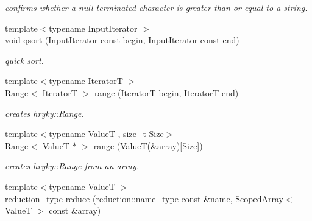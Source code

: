 \begin{DoxyCompactItemize}
\begin{DoxyCompactList}\small\item\em confirms whether a null-\/terminated character is greater than or equal to a string. \end{DoxyCompactList}\item 
{\footnotesize template$<$typename Input\-Iterator $>$ }\\void \hyperlink{namespacehryky_a438e3ee8f5109856c4a1e4daa9980982}{qsort} (Input\-Iterator const begin, Input\-Iterator const end)
\begin{DoxyCompactList}\small\item\em quick sort. \end{DoxyCompactList}\item 
\hypertarget{namespacehryky_a6093192359bc9630d58d6158bd0178f4}{{\footnotesize template$<$typename Iterator\-T $>$ }\\\hyperlink{classhryky_1_1_range}{Range}$<$ Iterator\-T $>$ \hyperlink{namespacehryky_a6093192359bc9630d58d6158bd0178f4}{range} (Iterator\-T begin, Iterator\-T end)}\label{namespacehryky_a6093192359bc9630d58d6158bd0178f4}

\begin{DoxyCompactList}\small\item\em creates \hyperlink{classhryky_1_1_range}{hryky\-::\-Range}. \end{DoxyCompactList}\item 
\hypertarget{namespacehryky_a6a1faca6d065095210f29e66a3219e1d}{{\footnotesize template$<$typename Value\-T , size\-\_\-t Size$>$ }\\\hyperlink{classhryky_1_1_range}{Range}$<$ Value\-T $\ast$ $>$ \hyperlink{namespacehryky_a6a1faca6d065095210f29e66a3219e1d}{range} (Value\-T(\&array)\mbox{[}Size\mbox{]})}\label{namespacehryky_a6a1faca6d065095210f29e66a3219e1d}

\begin{DoxyCompactList}\small\item\em creates \hyperlink{classhryky_1_1_range}{hryky\-::\-Range} from an array. \end{DoxyCompactList}\item 
\hypertarget{namespacehryky_aed1bf2a7c53af0daf10e630e023ad6c2}{{\footnotesize template$<$typename Value\-T $>$ }\\\hyperlink{namespacehryky_a343a9a4c36a586be5c2693156200eadc}{reduction\-\_\-type} \hyperlink{namespacehryky_aed1bf2a7c53af0daf10e630e023ad6c2}{reduce} (\hyperlink{namespacehryky_1_1reduction_ac686c30a4c8d196bbd0f05629a6b921f}{reduction\-::name\-\_\-type} const \&name, \hyperlink{classhryky_1_1_scoped_array}{Scoped\-Array}$<$ Value\-T $>$ const \&array)}\label{namespacehryky_aed1bf2a7c53af0daf10e630e023ad6c2}


\end{DoxyCompactItemize}
